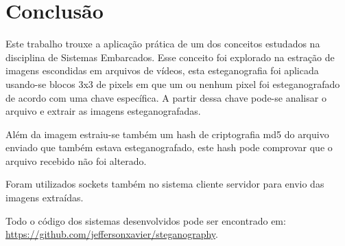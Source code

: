 \documentclass[journal,transmag]{IEEEtran}
\begin{document}
\section{Conclusão}

Este trabalho trouxe a aplicação prática de um dos conceitos estudados na disciplina de Sistemas Embarcados. Esse conceito foi explorado na estração de imagens escondidas em arquivos de vídeos, esta esteganografia foi aplicada usando-se blocos 3x3 de pixels em que um ou nenhum pixel foi esteganografado de acordo com uma chave específica. A partir dessa chave pode-se analisar o arquivo e extrair as imagens esteganografadas.

Além da imagem estraiu-se também um hash de criptografia md5 do arquivo enviado que também estava esteganografado, este hash pode comprovar que o arquivo recebido não foi alterado.

Foram utilizados sockets também no sistema cliente servidor para envio das imagens extraídas.

Todo o código dos sistemas desenvolvidos pode ser encontrado em: \url{https://github.com/jeffersonxavier/steganography}.
\end{document}

